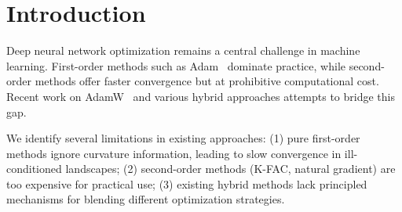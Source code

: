 \documentclass[10pt,twocolumn]{article}
\begin{document}
\section{Introduction}

Deep neural network optimization remains a central challenge in machine learning. First-order methods such as Adam~\cite{adam} dominate practice, while second-order methods offer faster convergence but at prohibitive computational cost. Recent work on AdamW~\cite{adamw} and various hybrid approaches attempts to bridge this gap.

We identify several limitations in existing approaches: (1) pure first-order methods ignore curvature information, leading to slow convergence in ill-conditioned landscapes; (2) second-order methods (K-FAC, natural gradient) are too expensive for practical use; (3) existing hybrid methods lack principled mechanisms for blending different optimization strategies.
\end{document}

